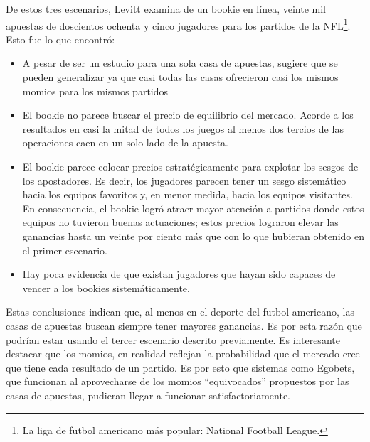 De estos tres escenarios, Levitt \cite{levitt2004gambling} examina de un bookie en línea, veinte mil apuestas de doscientos ochenta y cinco jugadores para los partidos de la NFL\footnote{La liga de futbol americano más popular: National Football League.}. Esto fue lo que encontró:
 \begin{itemize}
  \item A pesar de ser un estudio para una sola casa de apuestas, sugiere que se pueden generalizar ya que casi todas las casas ofrecieron casi los mismos momios para los mismos partidos
  \item El bookie no parece buscar el precio de equilibrio del mercado. Acorde a los resultados en casi la mitad de todos los juegos al menos dos tercios de las operaciones caen en un solo lado de la apuesta.
  \item El bookie parece colocar precios estratégicamente para explotar los sesgos de los apostadores. Es decir, los jugadores parecen tener un sesgo sistemático hacia los equipos favoritos y, en menor medida, hacia los equipos visitantes. En consecuencia, el bookie logró atraer mayor atención a partidos donde estos equipos no tuvieron buenas actuaciones; estos precios lograron elevar las ganancias hasta un veinte por ciento más que con lo que hubieran obtenido en el primer escenario.
  \item Hay poca evidencia de que existan jugadores que hayan sido capaces de vencer a los bookies sistemáticamente.
  \end{itemize}
 
 Estas conclusiones indican que, al menos en el deporte del futbol americano, las casas de apuestas buscan siempre tener mayores ganancias. Es por esta razón que podrían estar usando el tercer escenario descrito previamente. Es interesante destacar que los momios, en realidad reflejan la probabilidad que el mercado cree que tiene cada resultado de un partido. Es por esto que sistemas como Egobets, que funcionan al aprovecharse de los momios ``equivocados'' propuestos por las casas de apuestas, pudieran llegar a funcionar satisfactoriamente.
 
 
 

